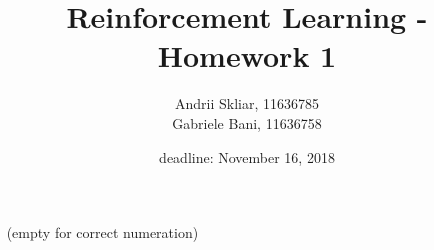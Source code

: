 \documentclass{exam}
\title{Reinforcement Learning - Homework 1} \date{deadline: November 16, 2018}
\author{Andrii Skliar, 11636785\\ Gabriele Bani, 11636758}
\begin{document}
\maketitle 





\begin{problem}[Instructions]
\ \newline
    (empty for correct numeration)
\end{problem}

\ \newline 
\end{document}
